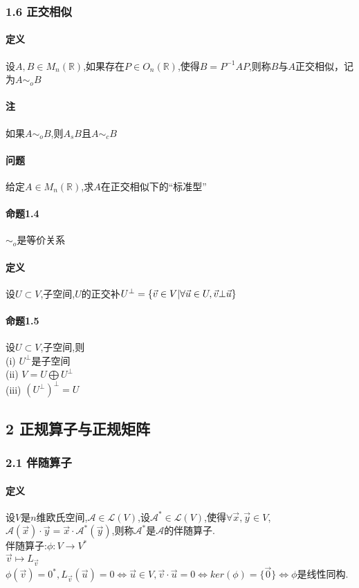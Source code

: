 \documentclass{ctexart}
\begin{document}
\subsubsection{1.6 正交相似}
\paragraph{定义}
设$A,B \in M_{n}(\mathbb{R})$,如果存在$P \in O_{n}(\mathbb{R})$,使得$B = P^{-1}AP$,则称$B$与$A$正交相似，记为$A\sim_{o}B$

\paragraph{注}
如果$A\sim_{o}B$,则$A_{s}B$且$A\sim_{c}B$
\paragraph{问题}
给定$A \in M_{n}(\mathbb{R})$,求$A$在正交相似下的“标准型”

\paragraph{命题1.4}
$\sim_{o}$是等价关系

\paragraph{定义}
设$U \subset V$,子空间,$U$的正交补$U^{\bot} = \{ \vec{v}\in V\arrowvert \forall \vec{u} \in U,\vec{v} \bot \vec{u}\}$

\paragraph{命题1.5}
设$U \subset V$,子空间,则\\
(i) $U^{\bot}$是子空间\\
(ii) $V = U \bigoplus U^{\bot}$\\
(iii) $(U^{\bot})^{\bot}=U$

\subsection{2 正规算子与正规矩阵}

\subsubsection{2.1 伴随算子}

\paragraph{定义}
设$V$是$n$维欧氏空间,$\mathcal{A} \in \mathcal{L}(V)$,设$\mathcal{A}^{*} \in \mathcal{L}(V)$,使得$\forall \vec{x},\vec{y} \in V$,$\mathcal{A}(\vec{x})\cdot \vec{y} = \vec{x} \cdot \mathcal{A}^{*}(\vec{y})$,则称$\mathcal{A}^{*}$是$\mathcal{A}$的伴随算子.\\
伴随算子:$\phi : V \rightarrow V^{*}$\\
$\vec{v} \mapsto L_{\vec{v}}$\\
$\phi(\vec{v}) = 0^{*},L_{\vec{v}}(\vec{u}) = 0 \Leftrightarrow \vec{u} \in V,\vec{v}\cdot\vec{u} = 0 \Leftrightarrow ker(\phi) = \{\vec{0}\} \Leftrightarrow \phi$是线性同构.
\end{document}

